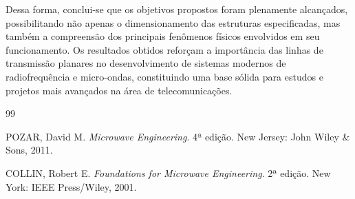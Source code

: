 \documentclass[12pt,a4paper]{report}
\begin{document}
Dessa forma, conclui-se que os objetivos propostos foram plenamente alcançados, possibilitando não apenas o dimensionamento das estruturas especificadas, mas também a compreensão dos principais fenômenos físicos envolvidos em seu funcionamento. Os resultados obtidos reforçam a importância das linhas de transmissão planares no desenvolvimento de sistemas modernos de radiofrequência e micro-ondas, constituindo uma base sólida para estudos e projetos mais avançados na área de telecomunicações.


\cleardoublepage
{}
{}

\begin{thebibliography}{99}

POZAR, David M.
\textit{Microwave Engineering}. 4ª edição.
New Jersey: John Wiley \& Sons, 2011.

COLLIN, Robert E.
\textit{Foundations for Microwave Engineering}. 2ª edição.
New York: IEEE Press/Wiley, 2001.

\end{thebibliography}
\end{document}
